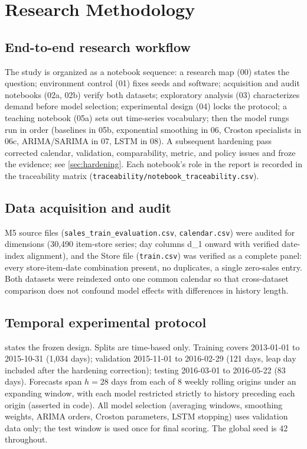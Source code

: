 \section{Research Methodology}
\label{sec:method}

\subsection{End-to-end research workflow}
\label{sec:workflow}
The study is organized as a notebook sequence: a research map (00) states the
question; environment control (01) fixes seeds and software; acquisition and
audit notebooks (02a, 02b) verify both datasets; exploratory analysis (03)
characterizes demand before model selection; experimental design (04) locks
the protocol; a teaching notebook (05a) sets out time-series vocabulary; then
the model rungs run in order (baselines in 05b, exponential smoothing in 06,
Croston specialists in 06c, ARIMA/SARIMA in 07, LSTM in 08). A subsequent
hardening pass corrected calendar, validation, comparability, metric, and
policy issues and froze the evidence; see \cref{sec:hardening}. Each
notebook's role in the report is recorded in the traceability matrix
(\texttt{traceability/notebook\_traceability.csv}).

\subsection{Data acquisition and audit}
\label{sec:acquisition}
M5 source files (\texttt{sales\_train\_evaluation.csv}, \texttt{calendar.csv})
were audited for dimensions (30,490 item-store series; day columns d\_1 onward
with verified date-index alignment), and the Store file (\texttt{train.csv})
was verified as a complete panel: every store-item-date combination present,
no duplicates, a single zero-sales entry. Both datasets were reindexed onto
one common calendar so that cross-dataset comparison does not confound model
effects with differences in history length.

\subsection{Temporal experimental protocol}
\label{sec:protocol}
 states the frozen design. Splits are time-based only.
Training covers 2013-01-01 to 2015-10-31 (1,034 days); validation 2015-11-01
to 2016-02-29 (121 days, leap day included after the hardening correction);
testing 2016-03-01 to 2016-05-22 (83 days). Forecasts span $h=28$ days from
each of 8 weekly rolling origins under an expanding window, with each model
restricted strictly to history preceding each origin (asserted in code). All
model selection (averaging windows, smoothing weights, ARIMA orders, Croston
parameters, LSTM stopping) uses validation data only; the test window is used
once for final scoring. The global seed is 42 throughout.


